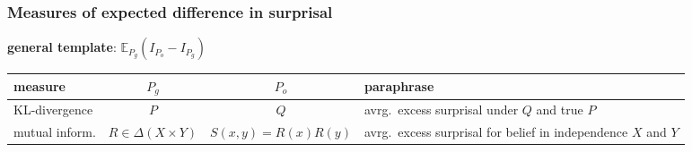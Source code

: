 \documentclass[fleqn,10pt,serif,xcolor=svgnames,xcolor=table,aspectratio=169,handout]{beamer}
\renewcommand{\markdef}[1]{\textcolor{themecolor}{\textbf{#1}}}
\begin{document}
\begin{frame}
  \frametitle{Measures of expected difference in surprisal}

  \markdef{general template}: $\mathds{E}_{P_{g}} (I_{P_{o}} - I_{P_{g}})$

  \bigskip
  \bigskip
  \bigskip

  \begin{center}
    \begin{tabular}[lcccp{4cm}]{lccp{5.5cm}}
      measure            & $P_{g}$                    & $P_{o}$                    & paraphrase \\ \midrule
      KL-divergence      & $P$                        & $Q$                        & \footnotesize{avrg.~excess surprisal under $Q$ and true $P$} \\
      mutual inform. & $R \in \Delta(X \times Y)$ & $S(x,y) = R(x) R(y)$ & \footnotesize{avrg.~excess surprisal for belief in independence $X$ and $Y$}\\
    \end{tabular}
  \end{center}

\end{frame}
\end{document}
